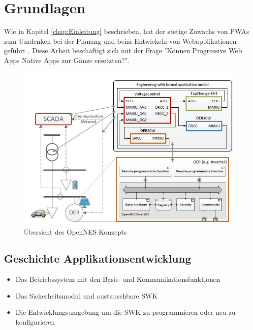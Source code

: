 \chapter{Grundlagen}
\thispagestyle{standard}
\pagestyle{standard}
\renewcommand{\footrulewidth}{0.4pt}

Wie in Kapitel \ref{chap:Einleitung} beschrieben, hat der stetige Zuwachs von \acs{PWA}s zum Umdenken bei der Planung und beim Entwickeln von Webapplikationen geführt \cite{DERs}.
Diese Arbeit beschäftigt sich mit der Frage "Können Progressive Web Apps Native Apps zur Gänze ersetzten?".
 


\begin{figure}[h]
	\centering
	\includegraphics[width=14cm]{BilderAllgemein/OpenNES_architecture}\medskip
	\caption{Übersicht des OpenNES Konzepts \cite{OpenNES}}
	\label{fig:Übersicht des OpenNES Konzepts}
\end{figure}

 
\section{Geschichte Applikationsentwicklung}

\begin{itemize}
    \item Das Betriebssystem mit den Basis- und Kommunikationsfunktionen
	\item Das Sicherheitsmodul und austauschbare \ac{SWK}
	\item Die Entwicklungsumgebung um die \acs{SWK} zu programmieren oder neu zu konfigurieren
\end{itemize}



